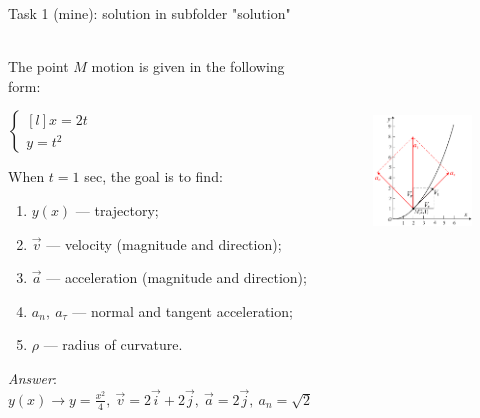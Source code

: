 \documentclass[aspectratio=169,xcolor=table,10pt, notes=hide]{beamer}
\begin{document}
\begin{frame}[t]{Task 1 (mine): solution in subfolder "solution"}
    \framesubtitle{}

    \begin{columns}[T,onlytextwidth]
        \begin{column}{0.55\textwidth}
            The point $M$ motion is given in the following form:

            $ \left\{\begin{matrix*}[l]
            x=2t\\ 
            y = t^2
            \end{matrix*}\right.$
            
            When $t = 1$ sec, the goal is to find:
            \begin{enumerate}
                \item $y(x)$ --- trajectory;
                \item $\vec{v}$ --- velocity (magnitude and direction);
                \item $\vec{a}$ --- acceleration (magnitude and direction);
                \item $a_n,\ a_\tau$ --- normal and tangent acceleration;
                \item $\rho$ --- radius of curvature. 
            \end{enumerate}
            \textit{Answer}: $y(x) \rightarrow y=\frac{x^2}{4},\ \vec{v} = 2\vec{i} + 2\vec{j},\ \vec{a}=2\vec{j},\ a_n=\sqrt{2},\ a_\tau = \sqrt{2},\ \rho=5.64$
        \end{column}
        \begin{column}{0.44\textwidth}
            \begin{figure}[H]
                \centering\includegraphics[height=6cm,width=1\textwidth,keepaspectratio]{image36.png}
            \end{figure}
        \end{column}
    \end{columns}

    \end{frame}
    
\end{document}
